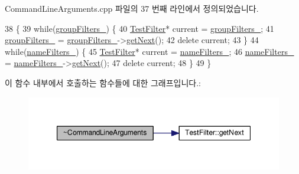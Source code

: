 Command\+Line\+Arguments.\+cpp 파일의 37 번째 라인에서 정의되었습니다.


\begin{DoxyCode}
38 \{
39     \textcolor{keywordflow}{while}(\hyperlink{class_command_line_arguments_a0efdcaf4d54223caffe82738f5db8061}{groupFilters\_}) \{
40         \hyperlink{class_test_filter}{TestFilter}* current = \hyperlink{class_command_line_arguments_a0efdcaf4d54223caffe82738f5db8061}{groupFilters\_};
41         \hyperlink{class_command_line_arguments_a0efdcaf4d54223caffe82738f5db8061}{groupFilters\_} = \hyperlink{class_command_line_arguments_a0efdcaf4d54223caffe82738f5db8061}{groupFilters\_}->\hyperlink{class_test_filter_ac7f0e458986dcfd442c3c8ee761344b0}{getNext}();
42         \textcolor{keyword}{delete} current;
43     \}
44     \textcolor{keywordflow}{while}(\hyperlink{class_command_line_arguments_ad2305aa697f8aab0ff0cbe9de842da56}{nameFilters\_}) \{
45         \hyperlink{class_test_filter}{TestFilter}* current = \hyperlink{class_command_line_arguments_ad2305aa697f8aab0ff0cbe9de842da56}{nameFilters\_};
46         \hyperlink{class_command_line_arguments_ad2305aa697f8aab0ff0cbe9de842da56}{nameFilters\_} = \hyperlink{class_command_line_arguments_ad2305aa697f8aab0ff0cbe9de842da56}{nameFilters\_}->\hyperlink{class_test_filter_ac7f0e458986dcfd442c3c8ee761344b0}{getNext}();
47         \textcolor{keyword}{delete} current;
48     \}
49 \}
\end{DoxyCode}


이 함수 내부에서 호출하는 함수들에 대한 그래프입니다.\+:
\nopagebreak
\begin{figure}[H]
\begin{center}
\leavevmode
\includegraphics[width=347pt]{class_command_line_arguments_a145906f2c932e925628330618834b91a_cgraph}
\end{center}
\end{figure}


